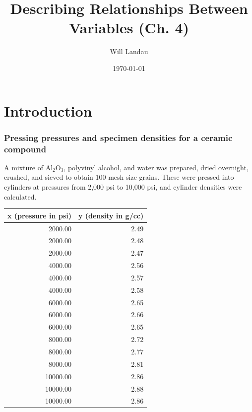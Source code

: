 \documentclass[handout]{beamer}\usepackage{graphicx, color}
\title{Describing Relationships Between Variables (Ch. 4)}
\author{Will Landau}
\date{\today}
\institute{Iowa State University}
\numberwithin{equation}{section}
\begin{document}
\begin{frame}
\titlepage
\end{frame}
 

\section{Introduction}

\begin{frame}[fragile]
\frametitle{\small Pressing pressures and specimen densities for a ceramic compound}
\scriptsize
A mixture of $\text{Al}_2\text{O}_3$, polyvinyl alcohol, and water was prepared, dried overnight, crushed, and sieved to obtain 100 mesh size grains. These were pressed into cylinders at pressures from 2,000 psi to 10,000 psi, and cylinder densities were calculated. 

\begin{table}[ht]
\centering
\begin{tabular}{rr}
 x (pressure in psi) & y (density in g/cc) \\ 
  \hline
2000.00 & 2.49 \\ 
  2000.00 & 2.48 \\ 
  2000.00 & 2.47 \\ 
  4000.00 & 2.56 \\ 
  4000.00 & 2.57 \\ 
  4000.00 & 2.58 \\ 
  6000.00 & 2.65 \\ 
  6000.00 & 2.66 \\ 
  6000.00 & 2.65 \\ 
  8000.00 & 2.72 \\ 
  8000.00 & 2.77 \\ 
  8000.00 & 2.81 \\ 
  10000.00 & 2.86 \\ 
  10000.00 & 2.88 \\ 
  10000.00 & 2.86 \\ 
  \end{tabular}
\end{table}



\end{frame}
\end{document}
